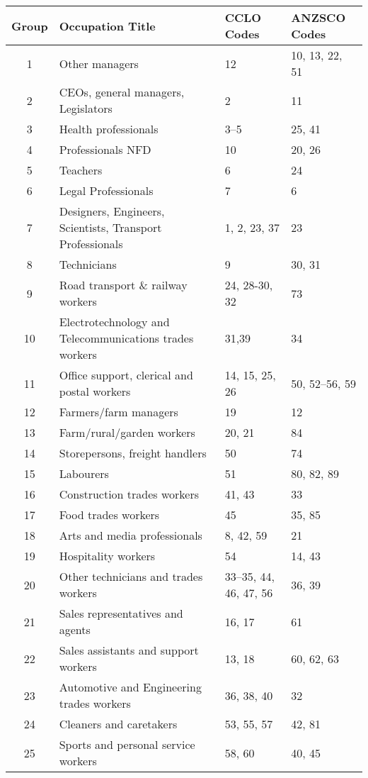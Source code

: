 \begin{sidewaystable}[ht]
\centering
\begin{tabular}{clll}
  \hline
{\bf Group} & {\bf Occupation Title} & {\bf CCLO Codes} & {\bf ANZSCO Codes} \\ 
  \hline
   1 & Other managers & 12 & 10, 13, 22, 51 \\ 
   2 & CEOs, general managers, Legislators & 2 & 11 \\ 
   3 & Health professionals & 3--5 & 25, 41 \\ 
   4 & Professionals NFD & 10 & 20, 26 \\ 
   5 & Teachers & 6 & 24 \\ 
   6 & Legal Professionals & 7 & 6 \\ 
   7 & Designers, Engineers, Scientists, Transport Professionals & 1, 2, 23, 37 & 23 \\ 
   8 & Technicians & 9 & 30, 31 \\ 
   9 & Road transport \& railway workers & 24, 28-30, 32 & 73 \\ 
  10 & Electrotechnology and Telecommunications trades workers & 31,39 & 34 \\ 
  11 & Office support, clerical and postal workers & 14, 15, 25, 26 & 50, 52--56, 59  \\ 
  12 & Farmers/farm managers & 19 & 12 \\ 
  13 & Farm/rural/garden workers & 20, 21 & 84 \\ 
  14 & Storepersons, freight handlers & 50 & 74 \\ 
  15 & Labourers & 51 & 80, 82, 89 \\ 
  16 & Construction trades workers & 41, 43 & 33 \\ 
  17 & Food trades workers & 45 & 35, 85 \\ 
  18 & Arts and media professionals & 8, 42, 59 & 21 \\ 
  19 & Hospitality workers & 54 & 14, 43 \\ 
  20 & Other technicians and trades workers & 33--35, 44, 46, 47, 56 & 36, 39 \\ 
  21 & Sales representatives and agents & 16, 17 & 61 \\ 
  22 & Sales assistants and support workers & 13, 18 & 60, 62, 63 \\ 
  23 & Automotive and Engineering trades workers & 36, 38, 40 & 32 \\ 
  24 & Cleaners and caretakers & 53, 55, 57 & 42, 81 \\ 
  25 & Sports and personal service workers & 58, 60 & 40, 45 \\ 

\end{tabular}
\end{sidewaystable}
